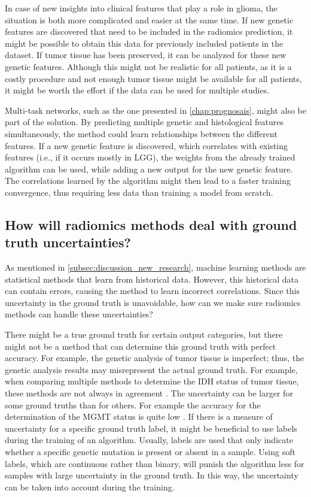 In case of new insights into clinical features that play a role in glioma, the situation is both more complicated and easier at the same time.
If new genetic features are discovered that need to be included in the radiomics prediction, it might be possible to obtain this data for previously included patients in the dataset.
If \gls{tumor} tissue has been preserved, it can be analyzed for these new genetic features.
Although this might not be realistic for all patients, as it is a costly procedure and not enough \gls{tumor} tissue might be available for all patients, it might be worth the effort if the data can be used for multiple studies.

Multi-task networks, such as the one presented in \cref{chap:prognosais}, might also be part of the solution.
By predicting multiple genetic and histological features simultaneously, the method could learn relationships between the different features.
If a new genetic feature is discovered, which correlates with existing features (i.e., if it occurs mostly in \gls{LGG}), the weights from the already trained algorithm can be used, while adding a new output for the new genetic feature.
The correlations learned by the algorithm might then lead to a faster training convergence, thus requiring less data than training a model from scratch.

\subsection{How will radiomics methods deal with ground truth uncertainties?}

As mentioned in \cref{subsec:discussion_new_research}, machine learning methods are statistical methods that learn from historical data.
However, this historical data can contain errors, causing the method to learn incorrect correlations.
Since this uncertainty in the ground truth is unavoidable, how can we make sure radiomics methods can handle these uncertainties?

There might be a true ground truth for certain output categories, but there might not be a method that can determine this ground truth with perfect accuracy.
For example, the genetic analysis of \gls{tumor} tissue is imperfect; thus, the genetic analysis results may misrepresent the actual ground truth.
For example, when comparing multiple methods to determine the \gls{IDH} status of \gls{tumor} tissue, these methods are not always in agreement \autocite{pyo2016concordance}.
The uncertainty can be larger for some ground truths than for others.
For example the accuracy for the determination of the \gls{MGMT} status is quite low \autocite{wang2017mgmt}.
If there is a measure of uncertainty for a specific ground truth label, it might be beneficial to use  labels during the training of an algorithm.
Usually, labels are used that only indicate whether a specific genetic mutation is present or absent in a sample.
Using soft labels, which are continuous rather than binary, will punish the algorithm less for samples with large uncertainty in the ground truth.
In this way, the uncertainty can be taken into account during the training.


